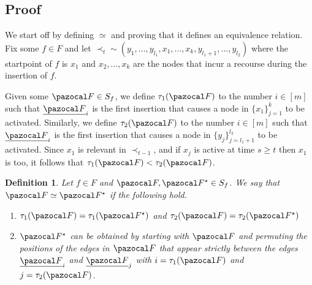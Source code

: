 \documentclass{article}
\newtheorem{definition}{Definition}
\begin{document}

\subsection{Proof}

We start off by defining $\simeq$ and proving that it defines an equivalence relation. Fix some $f \in F$ and let $\prec_t \sim (y_1,...,y_{l_1},x_1,...,x_k,y_{l_1+1},...,y_{l_2})$ where the startpoint of $f$ is $x_1$ and $x_2,...,x_k$ are the nodes that incur a recourse during the insertion of $f$.

Given some $\pazocal F \in S_f$, we define $\tau_1(\pazocal F)$ to the number $i \in [m]$ such that $\underline{\pazocal F}_i$ is the first insertion that causes a node in $\{x_1\}_{j=1}^{k}$ to be activated. Similarly, we define $\tau_2(\pazocal F)$ to the number $i \in [m]$ such that $\underline{\pazocal F}_i$ is the first insertion that causes a node in $\{y_j\}_{j=l_1+1}^{l_2}$ to be activated. Since $x_1$ is relevant in $\prec_{t-1}$, and if $x_j$ is active at time $s \geq t$ then $x_1$ is too, it follows that $\tau_1(\pazocal F) < \tau_2(\pazocal F)$.

\begin{definition}
Let $f \in F$ and $\pazocal F, \pazocal F^\star \in S_f$. We say that $\pazocal F \simeq \pazocal F^\star$ if the following hold.

\begin{enumerate}
    \item $\tau_1(\pazocal F) = \tau_1(\pazocal F^\star)$ and $\tau_2(\pazocal F) = \tau_2(\pazocal F^\star)$
    \item $\pazocal F^\star$ can be obtained by starting with $\pazocal F$ and permuting the positions of the edges in $\pazocal F$ that appear strictly between the edges $\underline{\pazocal F}_i$ and $\underline{\pazocal F}_j$ with $i=\tau_1(\pazocal F)$ and $j=\tau_2(\pazocal F)$.
\end{enumerate}
\end{definition}
\end{document}
